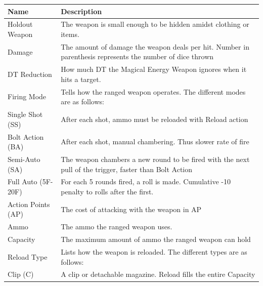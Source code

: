 \documentclass[11pt,a4paper,twocolumn]{book}
\begin{document}
	\clearpage
	{
		\begin{tabu} to 150mm{| X[l,1] | X[l,3] |}
			\hline
			 Name & Description                                                                            \\ \hline
			Holdout Weapon           & The weapon is small enough to be hidden amidst clothing or items.                                         \\
			Damage                   & The amount of damage the weapon deals per hit. Number in parenthesis represents the number of dice thrown \\
			DT Reduction             & How much DT the Magical Energy Weapon ignores when it hits a target.                                      \\
			Firing Mode              & Tells how the ranged weapon operates. The different modes are as follows:                                 \\
			Single Shot (SS)         & After each shot, ammo must be reloaded with Reload action                                                 \\
			Bolt Action (BA)         & After each shot, manual chambering. Thus slower rate of fire                                              \\
			Semi-Auto (SA)           & The weapon chambers a new round to be fired with the next pull of the trigger, faster than Bolt Action    \\
			Full Auto (5F-20F)       & For each 5 rounds fired, a roll is made. Cumulative -10 penalty to rolls after the first.                 \\
			Action Points (AP)       & The cost of attacking with the weapon in AP                                                               \\
			Ammo                     & The ammo the ranged weapon uses.                                                                          \\
			Capacity                 & The maximum amount of ammo the ranged weapon can hold                                                     \\
			Reload Type              & Lists how the weapon is reloaded. The different types are as follows:                                     \\
			Clip (C)                 & A clip or detachable magazine. Reload fills the entire Capacity                                           \\

\end{tabu}}
\end{document}

